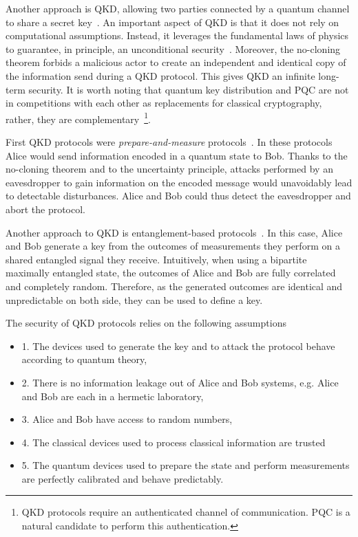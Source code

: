 Another approach is \acrfull{QKD}, allowing two parties connected by a quantum channel to share a secret key~\cite{Bennett84,Ekert1991,Gisin2002,Scarani2009}.
An important aspect of \acrshort{QKD} is that it does not rely on computational assumptions.
Instead, it leverages the fundamental laws of physics to guarantee, in principle, an unconditional security~\cite{Shor2000,Mayers2001}.
Moreover, the no-cloning theorem forbids a malicious actor to create an independent and identical copy of the information send during a \acrshort{QKD} protocol.
This gives \acrshort{QKD} an infinite long-term security.
It is worth noting that quantum key distribution and PQC are not in competitions with each other as replacements for classical cryptography, rather, they are complementary~\footnote{QKD protocols require an authenticated channel of communication. PQC is a natural candidate to perform this authentication.}.

\medbreak 

First \acrshort{QKD} protocols were \textit{prepare-and-measure} protocols~\cite{Bennett84,Grosshans2002,Grosshans2003}.
In these protocols Alice would send information encoded in a quantum state to Bob.
Thanks to the no-cloning theorem and to the uncertainty principle, attacks performed by an eavesdropper to gain information on the encoded message would unavoidably lead to detectable disturbances.
Alice and Bob could thus detect the eavesdropper and abort the protocol.

Another approach to \acrshort{QKD} is entanglement-based protocols~\cite{Ekert1991}.
In this case, Alice and Bob generate a key from the outcomes of  measurements they perform on a shared entangled signal they receive.
Intuitively, when using a bipartite maximally entangled state, the outcomes of Alice and Bob are fully correlated and completely random.
Therefore, as the generated outcomes are identical and unpredictable on both side, they can be used to define a key.

\medbreak

The security of QKD protocols relies on the following assumptions
\begin{itemize}
	\item 1. The devices used to generate the key and to attack the protocol behave according to quantum theory,
	\item 2. There is no information leakage out of Alice and Bob systems, e.g. Alice and Bob are each in a hermetic laboratory,
	\item 3. Alice and Bob have access to random numbers,
	\item 4. The classical devices used to process classical information are trusted 
	\item 5. The quantum devices used to prepare the state and perform measurements are perfectly calibrated and behave predictably.
\end{itemize}

